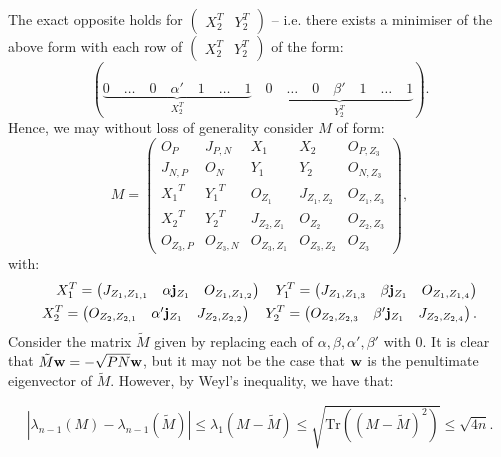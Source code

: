 \documentclass[12pt]{article}
\begin{document}
The exact opposite holds for $\begin{pmatrix}X_2^T & Y_2^T\end{pmatrix}$ -- i.e. there exists a minimiser of the above form with each row of $\begin{pmatrix} X_2^T & Y_2^T\end{pmatrix}$ of the form:\[(\underbrace{0 \quad \dots \quad 0 \quad \alpha' \quad 1 \quad \dots \quad 1}_{X_2^T} \quad \underbrace{0 \quad \dots \quad 0 \quad \beta' \quad 1 \quad \dots \quad 1}_{Y_2^T}).\]
Hence, we may without loss of generality consider $M$ of form:
\begin{equation*}
    M = \begin{pmatrix} O_{P} & J_{P,N} & X_1 & X_2 & O_{P,Z_3} \\ J_{N,P} & O_{N} & Y_1 & Y_2 & O_{N,Z_3}\\ {X_1}^T & {Y_1}^T & O_{Z_1} & J_{Z_1,Z_2} & O_{Z_1,Z_3} \\ {X_2}^T & {Y_2}^T & J_{Z_2,Z_1} & O_{Z_2}  & O_{Z_2,Z_3} \\ O_{Z_3,P} & O_{Z_3,N} & O_{Z_3,Z_1} & O_{Z_3,Z_2} & O_{Z_3}\end{pmatrix},
\end{equation*}
with:
\begin{align*}
    X_1^T = \begin{pmatrix}J_{Z_1,Z_{1,1}} &\alpha \bold{j}_{Z_1} & O_{Z_1,Z_{1,2}}\end{pmatrix} \quad Y_1^T = \begin{pmatrix}J_{Z_1,Z_{1,3}} &\beta \bold{j}_{Z_1} & O_{Z_1,Z_{1,4}}\end{pmatrix} \\ 
    X_2^T = \begin{pmatrix}O_{Z_2,Z_{2,1}} &\alpha' \bold{j}_{Z_1} & J_{Z_2,Z_{2,2}}\end{pmatrix} \quad Y_2^T = \begin{pmatrix}O_{Z_2,Z_{2,3}} &\beta' \bold{j}_{Z_1} & J_{Z_2,Z_{2,4}}\end{pmatrix}.
\end{align*}
Consider the matrix $\tilde{M}$ given by replacing each of $\alpha,\beta,\alpha',\beta'$ with 0. It is clear that $\tilde{M}\bold{w} = -\sqrt{PN}\bold{w}$, but it may not be the case that $\bold{w}$ is the penultimate eigenvector of $\tilde{M}$. However, by Weyl's inequality, we have that:

\begin{equation*}
    |\lambda_{n-1}(M) - \lambda_{n-1}(\tilde{M})| \le \lambda_1(M-\tilde{M})\le \sqrt{\text{Tr}((M-\tilde{M})^2)} \le \sqrt{4n}.
\end{equation*}
\end{document}
